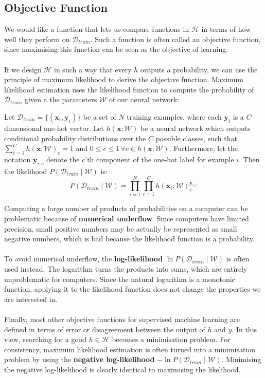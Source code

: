 \subsection{Objective Function}
We would like a function that lets us compare functions in $\mathcal{H}$ in terms of how well they perform on $\mathcal{D}_{train}$. Such a function is often called an objective function, since maximising this function can be seen as the objective of learning.
\\\\
If we design $\mathcal{H}$ in such a way that every $h$ outputs a probability, we can use the principle of maximum likelihood to derive the objective function. Maximum likelihood estimation uses the likelihood function to compute the probability of $\mathcal{D}_{train}$ given a the parameters $\mathcal{W}$ of our neural network:

\begin{definition}
	\label{likelihood}
	Let $\mathcal{D}_{train} = \{(\mathbf{x}_i, \mathbf{y}_i)\}$ be a set of $N$ training examples, where each $\mathbf{y}_i$ is a $C$ dimensional one-hot vector. Let $h(\mathbf{x}; \mathcal{W})$ be a neural network which outputs conditional probability distributions over the $C$ possible classes, such that $\sum_{c=1}^C h(\mathbf{x} ; \mathcal{W})_c = 1$ and $0 \leq c \leq 1 \,\forall c \in h(\mathbf{x};\mathcal{W})$. Furthermore, let the notation $\mathbf{y}_{i,c}$ denote the $c$'th component of the one-hot label for example $i$. Then the likelihood $P(\mathcal{D}_{train} \mid \mathcal{W})$ is:
	$$
	P(\mathcal{D}_{train} \mid \mathcal{W}) = \prod\limits_{i=1}^N\prod\limits_{c=1}^C h(\mathbf{x}_i;\mathcal{W})_c^{\mathbf{y}_{i,c}}
	$$
\end{definition}
\noindent
Computing a large number of products of probabilities on a computer can be problematic because of \textbf{numerical underflow}. Since computers have limited precision, small positive numbers may be actually be represented as small negative numbers, which is bad because the likelihood function is a probability.
\\\\
To avoid numerical underflow, the \textbf{log-likelihood} $\ln P(\mathcal{D}_{train} \mid \mathcal{W})$ is often used instead. The logarithm turns the products into sums, which are entirely unproblematic for computers. Since the natural logarithm is a monotonic function, applying it to the likelihood function does not change the properties we are interested in.
\\\\
Finally, most other objective functions for supervised machine learning are defined in terms of error or disagreement between the output of $h$ and $y$. In this view, searching for a good $h \in \mathcal{H}$ becomes a minimisation problem. For consistency, maximum likelihood estimation is often turned into a minimisation problem by using the \textbf{negative log-likelihood} $-\ln P(\mathcal{D}_{train} \mid \mathcal{W})$. Minimising the negative log-likelihood is clearly identical to maximising the likelihood.

